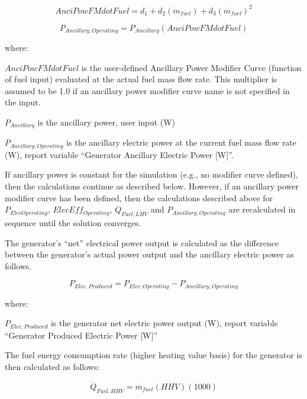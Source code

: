 \begin{equation}
AnciPowFMdotFuel = {d_1} + {d_2}\left( {{{\dot m}_{fuel}}} \right) + {d_3}{\left( {{{\dot m}_{fuel}}} \right)^2}
\end{equation}

\begin{equation}
{P_{Ancillary,Operating}} = {P_{Ancillary}}\left( {AnciPowFMdotFuel} \right)
\end{equation}

where:

\(AnciPowFMdotFuel\) is the user-defined Ancillary Power Modifier Curve (function of fuel input) evaluated at the actual fuel mass flow rate. This multiplier is assumed to be 1.0 if an ancillary power modifier curve name is not specified in the input.

\({P_{Ancillary}}\) is the ancillary power, user input (W)

\({P_{Ancillary,Operating}}\) is the ancillary electric power at the current fuel mass flow rate (W), report variable ``Generator Ancillary Electric Power {[}W{]}''.

If ancillary power is constant for the simulation (e.g., no modifier curve defined), then the calculations continue as described below. However, if an ancillary power modifier curve has been defined, then the calculations described above for \(P_{ElecOperating}\), \(ElecEff_{Operating}\), \({\dot Q_{Fuel,LHV}}\) and \(P_{Ancillary,Operating}\) are recalculated in sequence until the solution converges.

The generator's ``net'' electrical power output is calculated as the difference between the generator's actual power output and the ancillary electric power as follows.

\begin{equation}
{P_{Elec,Produced}} = {P_{Elec,Operating}} - {P_{Ancillary,Operating}}
\end{equation}

where:

\({P_{Elec,Produced}}\) is the generator net electric power output (W), report variable ``Generator Produced Electric Power {[}W{]}''

The fuel energy consumption rate (higher heating value basis) for the generator is then calculated as follows:

\begin{equation}
{\dot Q_{Fuel,HHV}} = {\dot m_{fuel}}\left( {HHV} \right)\left( {1000} \right)
\end{equation}

